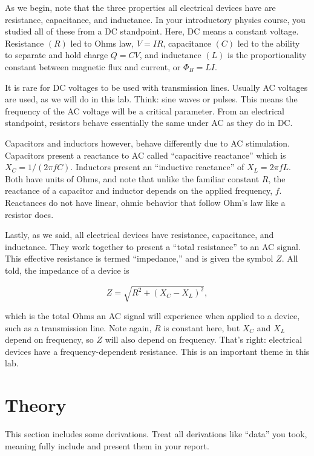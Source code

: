 \documentclass[12pt]{article}
\begin{document}
As we begin, note that the three properties all electrical devices have are resistance, capacitance, and inductance.  In your introductory physics course, you studied all of these from a DC standpoint. Here, DC means a constant voltage.  Resistance $(R)$ led to Ohms law, $V=IR$, capacitance $(C)$ led to the ability to separate and hold charge $Q=CV$, and inductance $(L)$ is the proportionality constant between magnetic flux and current, or $\Phi_B=LI$.

It is rare for DC voltages to be used with transmission lines. Usually AC voltages are used, as we will do in this lab. Think: sine waves or pulses. This means the frequency of the AC voltage will be a critical parameter.  From an electrical standpoint, resistors behave essentially the same under AC as they do in DC. 

Capacitors and inductors however, behave differently due to AC stimulation.  Capacitors present a reactance to AC called ``capacitive reactance'' which is $X_C=1/(2\pi fC)$.  Inductors present an ``inductive reactance'' of $X_L=2\pi fL$. Both have units of Ohms, and note that unlike the familiar constant $R$, the reactance of a capacitor and inductor depends on the applied frequency, $f$. Reactances do not have linear, ohmic behavior that follow Ohm's law like a resistor does.

Lastly, as we said, all electrical devices have resistance, capacitance, and inductance. They work together to present a ``total resistance'' to an AC signal. This effective resistance is termed ``impedance,'' and is given the symbol $Z$.  All told, the impedance of a device is

\begin{equation}
\label{Z}
Z=\sqrt{R^2+(X_C-X_L)^2},
\end{equation}

which is the total Ohms an AC signal will experience when applied to a device, such as a transmission line.  Note again, $R$ is constant here, but $X_C$ and $X_L$ depend on frequency, so $Z$ will also depend on frequency. That's right: electrical devices have a frequency-dependent resistance. This is an important theme in this lab.



 
\section{Theory}

This section includes some derivations. Treat all derivations like ``data'' you took, meaning fully include and present them in your report.
\end{document}
